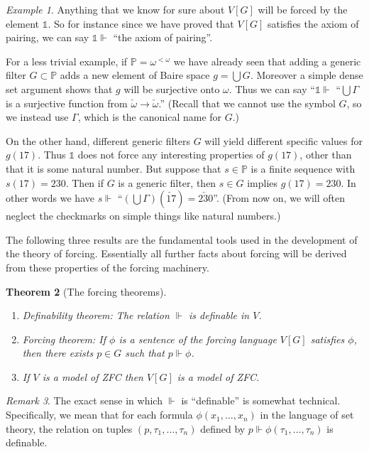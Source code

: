 \documentclass[11pt,oneside]{amsbook}
\newcommand{\forces}{\Vdash}
\theoremstyle{definition}
\theoremstyle{plain}
\newtheorem{thm}{Theorem}[section]
\theoremstyle{definition}
\theoremstyle{remark}
\newtheorem{rem}[thm]{Remark}
\newtheorem{example}[thm]{Example}
\numberwithin{equation}{section}
\numberwithin{figure}{section}
\begin{document}
\begin{example}
  Anything that we know for sure about $V[G]$ will be forced by the element $\mathbb 1$. So for instance since we have proved that $V[G]$ satisfies the axiom of pairing, we can say $\mathbb 1\forces$ ``the axiom of pairing''.

  For a less trivial example, if $\mathbb P=\omega^{<\omega}$ we have already seen that adding a generic filter $G\subset\mathbb P$ adds a new element of Baire space $g=\bigcup G$. Moreover a simple dense set argument shows that $g$ will be surjective onto $\omega$. Thus we can say ``$\mathbb 1\forces$ ``$\bigcup\Gamma$ is a surjective function from $\check\omega\to\check\omega$.'' (Recall that we cannot use the symbol $G$, so we instead use $\Gamma$, which is the canonical name for $G$.)

  On the other hand, different generic filters $G$ will yield different specific values for $g(17)$. Thus $\mathbb 1$ does not force any interesting properties of $g(17)$, other than that it is some natural number. But suppose that $s\in\mathbb P$ is a finite sequence with $s(17)=230$. Then if $G$ is a generic filter, then $s\in G$ implies $g(17)=230$. In other words we have $s\forces$ ``$(\bigcup\Gamma)(\check{17})=\check{230}$''. (From now on, we will often neglect the checkmarks on simple things like natural numbers.)
\end{example}

The following three results are the fundamental tools used in the development of the theory of forcing. Essentially all further facts about forcing will be derived from these properties of the forcing machinery.

\begin{thm}[The forcing theorems]\
\label{thm:forcing}
\begin{enumerate}
\item \textup{Definability theorem}: The relation $\forces$ is definable in $V$.
\item \textup{Forcing theorem}: If $\phi$ is a sentence of the forcing language $V[G]$ satisfies $\phi$, then there exists $p\in G$ such that $p\forces\phi$.
\item If $V$ is a model of ZFC then $V[G]$ is a model of ZFC.
\end{enumerate}
\end{thm}

\begin{rem}
  The exact sense in which $\forces$ is ``definable'' is somewhat technical. Specifically, we mean that for each formula $\phi(x_1,\ldots,x_n)$ in the language of set theory, the relation on tuples $(p,\tau_1,\ldots,\tau_n)$ defined by $p\forces\phi(\tau_1,\ldots,\tau_n)$ is definable.
\end{rem}
\end{document}
